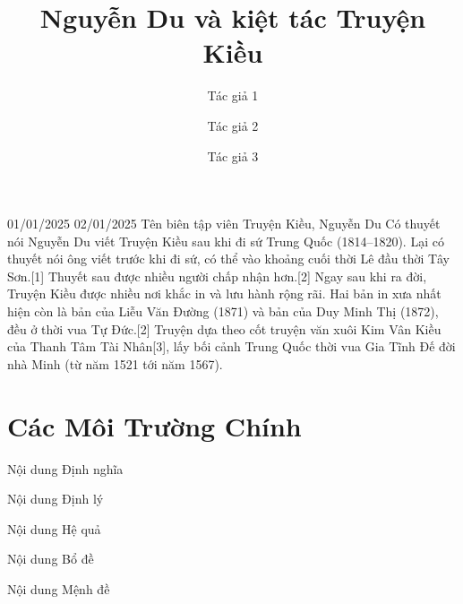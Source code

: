 \documentclass[5p,times,authoryear]{Config/elsarticle}
\begin{document}
\resetsections
\resetarticledata
\resetalltheorems


\begin{frontmatter}

\title{Nguyễn Du và kiệt tác Truyện Kiều}

\author[First]{Tác giả 1}
\author[Second]{Tác giả 2}
\author[Third]{Tác giả 3}


\address[First]{Thông tin tác giả 1 }
\address[Second]{Thông tin tác giả 2}
\address[Third]{Thông tin tác giả 3}

\end{frontmatter}

\VnArticleInfo
  {01/01/2025} %
  {02/01/2025} %
  {Tên biên tập viên} %
  {Truyện Kiều, Nguyễn Du} %
  {Có thuyết nói Nguyễn Du viết Truyện Kiều sau khi đi sứ Trung Quốc
(1814–1820). Lại có thuyết nói ông viết trước khi đi sứ, có thể vào khoảng cuối
thời Lê đầu thời Tây Sơn.[1] Thuyết sau được nhiều người chấp nhận hơn.[2]
Ngay sau khi ra đời, Truyện Kiều được nhiều nơi khắc in và lưu hành rộng rãi.
Hai bản in xưa nhất hiện còn là bản của Liễu Văn Đường (1871) và bản của
Duy Minh Thị (1872), đều ở thời vua Tự Đức.[2] Truyện dựa theo cốt truyện
văn xuôi Kim Vân Kiều của Thanh Tâm Tài Nhân[3], lấy bối cảnh Trung Quốc
thời vua Gia Tĩnh Đế đời nhà Minh (từ năm 1521 tới năm 1567).} %
\section{Các Môi Trường Chính}


\begin{dn}
    Nội dung Định nghĩa 
\end{dn}

\begin{dl}
   Nội dung Định lý
\end{dl}

\begin{cm}
    
\end{cm}

\begin{hq}
    Nội dung Hệ quả
\end{hq}

\begin{bd}
    Nội dung Bổ đề
\end{bd}

\begin{md}
    Nội dung Mệnh đề
\end{md}
\end{document}
